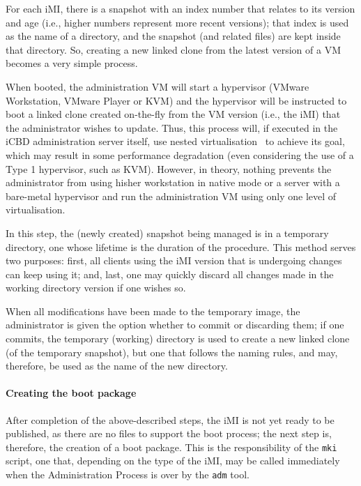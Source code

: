 For each iMI, there is a snapshot with an index number that relates to its version and age (i.e., higher numbers represent more recent versions); that index is used as the name of a directory, and the snapshot (and related files) are kept inside that directory. So, creating a new linked clone from the latest version of a VM becomes a very simple process.

When booted, the administration VM will start a hypervisor (VMware Workstation, VMware Player
or KVM) and the hypervisor will be instructed to boot a linked clone created on-the-fly from the VM version (i.e., the iMI) that the administrator wishes to update. Thus, this process will, if executed in the iCBD administration server itself, use nested virtualisation~\cite{kvm_nested} to achieve its goal, which may result in some performance degradation (even considering the use of a Type 1 hypervisor, such as KVM). However, in theory, nothing prevents the administrator from using his\/her workstation in native mode or a server with a bare-metal hypervisor and run the administration VM using only one level of virtualisation.

In this step, the (newly created) snapshot being managed is in a temporary directory, one whose lifetime is the duration of the procedure. This method serves two purposes: first, all clients using the iMI version that is undergoing changes can keep using it; and, last, one may quickly discard all changes made in the working directory version if one wishes so.

When all modifications have been made to the temporary image, the administrator is given the option whether to commit or discarding them; if one commits, the temporary (working) directory is used to create a new linked clone (of the temporary snapshot), but one that follows the naming rules, and may, therefore, be used as the name of the new directory.



\paragraph{Creating the boot package}
\label{par:icbd_create_bootpack}

After completion of the above-described steps, the iMI is not yet ready to be published, as there are no files to support the boot process; the next step is, therefore, the creation of a boot package. This is the responsibility of the \texttt{mki} script, one that, depending on the type of the iMI, may be called immediately when the Administration Process is over by the \texttt{adm} tool.

